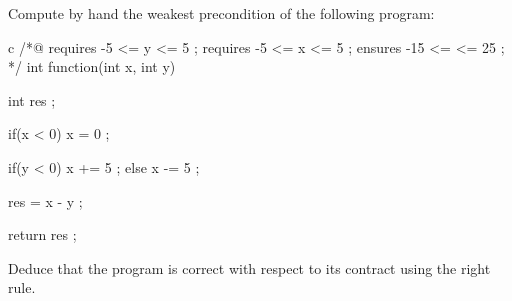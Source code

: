 

Compute by hand the weakest precondition of the following program:


\begin{CodeBlock}{c}
/*@
  requires -5 <= y <= 5 ;
  requires -5 <= x <= 5 ;
  ensures  -15 <= \result <= 25 ;
*/
int function(int x, int y){
  int res ;

  if(x < 0){
    x = 0 ;
  }

  if(y < 0){
    x += 5 ;
  } else {
    x -= 5 ;
  }

  res = x - y ;

  return res ;
}
\end{CodeBlock}


Deduce that the program is correct with respect to its contract using the
right rule.
